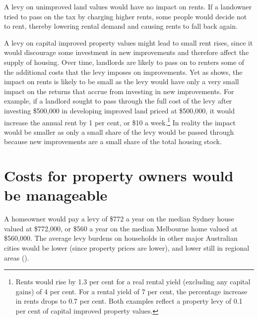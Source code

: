A levy on unimproved land values would have no impact on rents. If a landowner tried to pass on the tax by charging higher rents, some people would decide not to rent, thereby lowering rental demand and causing rents to fall back again.

A levy on capital improved property values might lead to small rent rises, since it would discourage some investment in new improvements and therefore affect the supply of housing. Over time, landlords are likely to pass on to renters some of the additional costs that the levy imposes on improvements. Yet as  shows, the impact on rents is likely to be small as the levy would have only a very small impact on the returns that accrue from investing in new improvements. For example, if a landlord sought to pass through the full cost of the levy after investing \$500,000 in developing improved land priced at \$500,000, it would increase the annual rent by 1 per cent, or \$10 a week.\footnote{Rents would rise by 1.3 per cent for a real rental yield (excluding any capital gains) of 4 per cent. For a rental yield of 7 per cent, the percentage increase in rents drops to 0.7 per cent. Both examples reflect a property levy of 0.1 per cent of capital improved property values.}  In reality the impact would be smaller as only a small share of the levy would be passed through because new improvements are a small share of the total housing stock.

\section{Costs for property owners would be manageable}
A homeowner would pay a levy of \$772 a year on the median Sydney house valued at \$772,000, or \$560 a year on the median Melbourne home valued at \$560,000. The average levy burdens on households in other major Australian cities would be lower (since property prices are lower), and lower still in regional areas (). 

